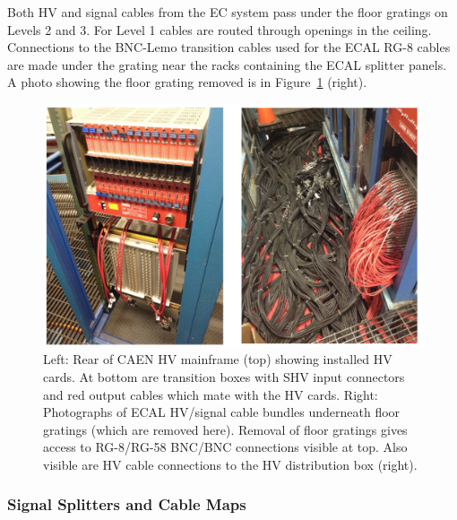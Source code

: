 \documentclass[letterpaper,10pt]{article}
\begin{document}
Both HV and signal cables from the EC system pass under the floor gratings on Levels 2 and 3.  For Level 1
cables are routed through openings in the ceiling.  Connections to the BNC-Lemo transition cables used for the ECAL
RG-8 cables are made under the grating near the racks containing the ECAL splitter panels.  A photo showing
the floor grating removed is in Figure~\ref{fc-layout-3} (right).

\begin{figure}[htbp]
  \centering
  \includegraphics[width= 6in, keepaspectratio = true]{Cable-routing}
  \vspace{2mm}
  \caption{Left: Rear of CAEN HV mainframe (top) showing installed HV cards.  At bottom are transition
    boxes with SHV input connectors and red output cables which mate with the HV cards.  Right: Photographs
    of ECAL HV/signal cable bundles underneath floor gratings (which are removed here). Removal of floor gratings
    gives access to RG-8/RG-58 BNC/BNC connections visible at top.  Also visible are HV cable connections to
    the HV distribution box (right).}
  \label{fc-layout-3} 
\end{figure}

\subsubsection{Signal Splitters and Cable Maps}
\label{hv-layout}
\end{document}
